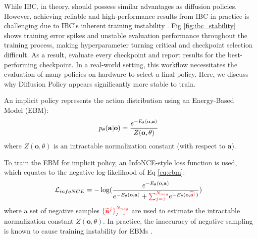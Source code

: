 While IBC, in theory, should possess similar advantages as diffusion policies. However, achieving reliable and high-performance results from IBC in practice is challenging due to IBC's inherent training instability \cite{ta2022conditional}. Fig \ref{fig:ibc_stability} shows training error spikes and unstable evaluation performance throughout the training process, making hyperparameter turning critical and checkpoint selection difficult. As a result, \citet{ibc} evaluate every checkpoint and report results for the best-performing checkpoint. In a real-world setting, this workflow necessitates the evaluation of many policies on hardware to select a final policy. Here, we discuss why Diffusion Policy appears significantly more stable to train.


An implicit policy represents the action distribution using an Energy-Based Model (EBM):
\vspace{-2mm}
\begin{equation}
    \label{eq:ebm}
    p_\theta(\mathbf{a}|\mathbf{o})=\frac{e^{-E_\theta(\mathbf{o},\mathbf{a})}}{Z(\mathbf{o},\theta)}
\vspace{-1mm}
\end{equation}
where $Z(\mathbf{o},\theta)$ is an intractable normalization constant (with respect to $\mathbf{a}$). 

To train the EBM for implicit policy, an InfoNCE-style loss function is used, which equates to the negative log-likelihood of Eq \ref{eq:ebm}:
\begin{equation}
    \label{eq:infonce}
    \mathcal{L}_{infoNCE}=-\log(\frac{
        e^{-E_\theta(\mathbf{o},\mathbf{a})}
    }{
        e^{-E_\theta(\mathbf{o},\mathbf{a})} + 
            \textcolor{red}{\sum^{N_{neg}}_{j=1}}e^{
                -E_\theta(\mathbf{o},\textcolor{red}{\widetilde{\mathbf{a}}^j})}
    })
\end{equation}
where a set of negative samples $\textcolor{red}{\{\widetilde{\mathbf{a}}^j\}^{N_{neg}}_{j=1}}$ are used to estimate the intractable normalization constant $Z(\mathbf{o},\theta)$. In practice, the inaccuracy of negative sampling is known to cause training instability for EBMs \cite{du2020improved,ta2022conditional}.


